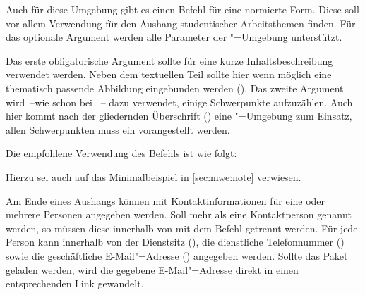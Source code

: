 \documentclass[%
  english,ngerman,%
  headings=optiontoheadandtoc,captions=tableheading,numbers=noenddot,%
  chapterpage,cdfoot,%
]{tudscrman}
\begin{document}
\begin{Declaration}{\LParameter%
}
\printdeclarationlist%
Auch für diese Umgebung gibt es einen Befehl für eine normierte Form. Diese soll 
vor allem Verwendung für den Aushang studentischer Arbeitsthemen finden. Für das 
optionale Argument werden alle Parameter der "=Umgebung 
unterstützt.

Das erste obligatorische Argument sollte für eine kurze Inhaltsbeschreibung 
verwendet werden. Neben dem textuellen Teil sollte hier wenn möglich eine 
thematisch passende Abbildung eingebunden werden (). Das 
zweite Argument wird~--wie schon bei ~-- dazu verwendet, einige 
Schwerpunkte aufzuzählen. Auch hier kommt nach der gliedernden Überschrift 
() eine "=Umgebung zum Einsatz, allen 
Schwerpunkten muss ein  vorangestellt werden.
%
\end{Declaration}
%
\begin{Example}
Die empfohlene Verwendung des Befehls  ist wie folgt:
\begin{code}[escapechar=§]
}{%
  \item Schwerpunkt 1
  \item Schwerpunkt 2
}
\end{code}
Hierzu sei auch auf das Minimalbeispiel in \autoref{sec:mwe:note} verwiesen.
\end{Example}

\begin{Declaration}{}
\begin{Declaration}{}
\begin{Declaration}{}
\begin{Declaration}{}
\printdeclarationlist%
Am Ende eines Aushangs können mit  Kontaktinformationen für eine 
oder mehrere Personen angegeben werden. Soll mehr als eine Kontaktperson genannt 
werden, so müssen diese innerhalb von  mit dem Befehl 
 getrennt werden. Für jede Person kann innerhalb von  
der Dienstsitz (), die dienstliche Telefonnummer () 
sowie die geschäftliche E-Mail"=Adresse () angegeben werden. 
Sollte das Paket  geladen werden, wird die gegebene 
E-Mail"=Adresse direkt in einen entsprechenden Link gewandelt.
\end{Declaration}
\end{Declaration}
\end{Declaration}
\end{Declaration}
\end{document}
